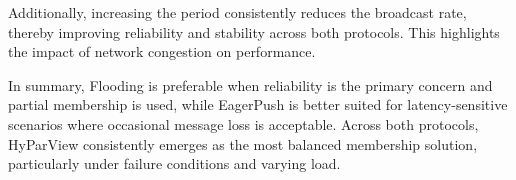 \documentclass[sigconf,a4paper]{acmart}
\begin{document}
Additionally, increasing the period consistently reduces the broadcast rate, thereby improving 
reliability and stability across both protocols. This highlights the impact of network congestion 
on performance.

In summary, Flooding is preferable when reliability is the primary concern and partial 
membership is used, while EagerPush is better suited for latency-sensitive scenarios where 
occasional message loss is acceptable. Across both protocols, HyParView consistently emerges 
as the most balanced membership solution, particularly under failure conditions and varying load.



\end{document}
